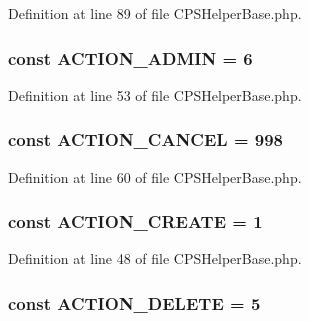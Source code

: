 Definition at line 89 of file CPSHelperBase.php.

\hypertarget{classCPSHelperBase_a40afbdc229854c77e24353b459713784}{
\subsubsection[{ACTION\_\-ADMIN}]{\setlength{\rightskip}{0pt plus 5cm}const {\bf ACTION\_\-ADMIN} = 6}}
\label{classCPSHelperBase_a40afbdc229854c77e24353b459713784}


Definition at line 53 of file CPSHelperBase.php.

\hypertarget{classCPSHelperBase_a03e2e4af94065db773598c46a3d457f8}{
\subsubsection[{ACTION\_\-CANCEL}]{\setlength{\rightskip}{0pt plus 5cm}const {\bf ACTION\_\-CANCEL} = 998}}
\label{classCPSHelperBase_a03e2e4af94065db773598c46a3d457f8}


Definition at line 60 of file CPSHelperBase.php.

\hypertarget{classCPSHelperBase_a9c06ab2db927f3b687a12bf1bed808cd}{
\subsubsection[{ACTION\_\-CREATE}]{\setlength{\rightskip}{0pt plus 5cm}const {\bf ACTION\_\-CREATE} = 1}}
\label{classCPSHelperBase_a9c06ab2db927f3b687a12bf1bed808cd}


Definition at line 48 of file CPSHelperBase.php.

\hypertarget{classCPSHelperBase_a274e654ac39438f682f6bf1eb450395e}{
\subsubsection[{ACTION\_\-DELETE}]{\setlength{\rightskip}{0pt plus 5cm}const {\bf ACTION\_\-DELETE} = 5}}
\label{classCPSHelperBase_a274e654ac39438f682f6bf1eb450395e}


